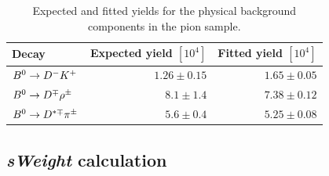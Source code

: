 \begin{table}
	\centering
	\caption{Expected and fitted yields for the physical background components in the pion sample.}
	\label{tab:expVSfitYields}
	\begin{tabular}{lrr}
		\toprule
		Decay & Expected yield $[10^{4}]$ & Fitted yield $[10^{4}]$ \\
		\hline
		$B^0\rightarrow D^-K^+$ & $1.26\pm0.15$ & $1.65\pm0.05$ \\
		$B^0\rightarrow D^\mp\rho^\pm$ & $8.1\pm1.4$ & $7.38\pm0.12$ \\
		$B^0\rightarrow D^{*\mp}\pi^\pm$ & $5.6\pm0.4$ & $5.25\pm0.08$ \\
		\bottomrule
	\end{tabular}
\end{table}


\subsection{\emph{sWeight} calculation}
\label{sec:fitB}

